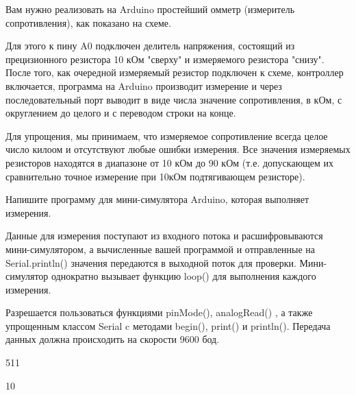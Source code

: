 
Вам нужно реализовать на Arduino простейший омметр (измеритель сопротивления), как показано на схеме. 


Для этого к пину A0 подключен делитель напряжения, состоящий из прецизионного резистора 10 кОм "сверху" и измеряемого резистора "снизу".  После того, как очередной измеряемый резистор подключен к схеме, контроллер включается, программа на Arduino производит измерение и через последовательный порт выводит в виде числа значение сопротивления, в кОм, с округлением до целого и с переводом строки на конце.   

Для упрощения,  мы принимаем, что измеряемое сопротивление всегда целое число килоом и отсутствуют любые ошибки измерения. Все значения измеряемых резисторов находятся в диапазоне от 10 кОм до 90 кОм (т.е. допускающем их сравнительно точное измерение при 10кОм подтягивающем резисторе).


Напишите программу для мини-симулятора Arduino, которая выполняет измерения.

Данные для измерения поступают из входного потока и расшифровываются мини-симулятором, а вычисленные вашей программой и отправленные на Serial.println() значения передаются в выходной поток для проверки.  Мини-симулятор однократно вызывает функцию loop() для выполнения каждого измерения. 

Разрешается пользоваться функциями pinMode(), analogRead() ,  а также упрощенным классом Serial c методами begin(), print() и println().  Передача данных должна происходить на скорости 9600 бод.

\begin{myverbbox}[\small]{\vinput}
    511
\end{myverbbox}
\begin{myverbbox}[\small]{\voutput}
    10
\end{myverbbox}

